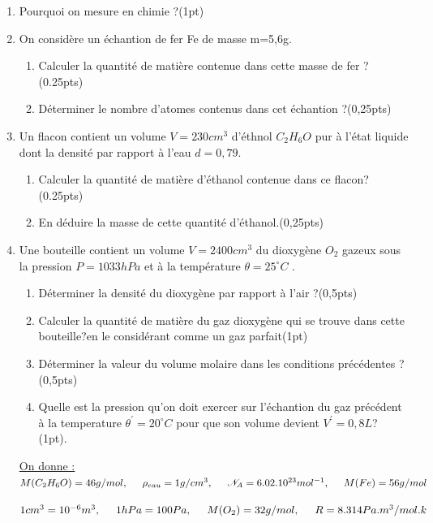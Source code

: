 \documentclass[12pt]{article}
\begin{document}
\begin{enumerate}
  \item Pourquoi on mesure en chimie ?\dotfill(1pt)
  \item On considère un échantion de fer Fe de masse m=5,6g.
      \begin{enumerate}
          \item Calculer la quantité de matière contenue dans cette masse de fer ?\dotfill(0.25pts)
          \item Déterminer le nombre d’atomes contenus dans cet échantion ?\dotfill(0,25pts)
      \end{enumerate}
    \item Un flacon contient un volume $V=230cm^3$ d’éthnol $C_2H_6O$ pur à l’état liquide dont la densité par rapport à l’eau $d=0,79$.
        \begin{enumerate}
                \item Calculer la quantité de matière d’éthanol contenue dans ce flacon?\dotfill(0.25pts)
                \item  En déduire la masse de cette quantité d’éthanol.\dotfill(0,25pts)
        \end{enumerate}
    \item Une bouteille contient un volume $V=2400cm^3$ du dioxygène $O_2$ gazeux sous la pression $P=1033hPa$ et à la température $\theta = 25^{\circ} C$ .
        \begin{enumerate}
            \item Déterminer la densité du dioxygène par rapport à l’air ?\dotfill(0,5pts)
            \item  Calculer la quantité de matière du gaz dioxygène qui se trouve dans cette bouteille?en le considérant comme un gaz parfait\dotfill(1pt)

            \item Déterminer la valeur du volume molaire dans les conditions précédentes ?\dotfill(0,5pts)
            \item  Quelle est la pression qu’on doit exercer sur l’échantion du gaz précédent à la temperature \hspace{50pt}$ \theta^{'} = 20^{\circ}C$ pour que son volume devient $V^{'}=0,8L$? \dotfill(1pt).
        \end{enumerate}
        \underline{On donne :} $M(C_2H_6O) = 46g/mol ,\hspace{5mm} \rho_{eau} = 1g/cm^3 , \hspace{5mm}\mathscr{N}_A = 6.02.10^{23}mol^{-1}, \hspace{5mm}M(Fe) =56g/mol $

        $1cm^{3}=10^{-6}m^3 , \hspace{5mm}1hPa = 100Pa ,\hspace{5mm}M(O_2)=32g/mol,\hspace{5mm} R = 8.314Pa.m^3/mol.k$
\end{enumerate}
\end{document}
